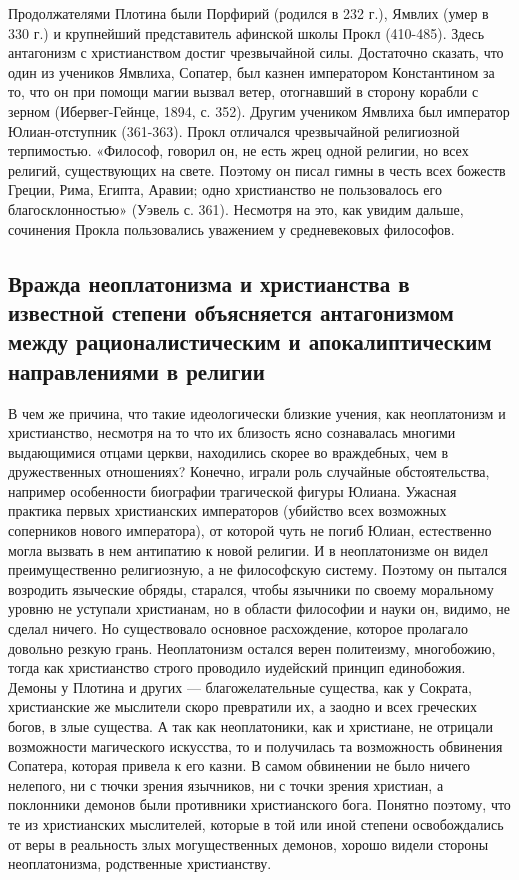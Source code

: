 Продолжателями Плотина были Порфирий (родился в 232 г.), Ямвлих (умер
в 330 г.) и крупнейший представитель афинской школы Прокл (410-485).
Здесь антагонизм с христианством достиг чрезвычайной силы.
Достаточно сказать, что один из учеников Ямвлиха, Сопатер, был казнен
императором Константином за то, что он при помощи магии вызвал ветер,
отогнавший в сторону корабли с зерном (Ибервег-Гейнце, 1894, с. 352).
Другим учеником Ямвлиха был император Юлиан-отступник (361-363). Прокл
отличался чрезвычайной религиозной терпимостью. «Философ, говорил он,
не есть жрец одной религии, но всех религий, существующих на свете.
Поэтому он писал гимны в честь всех божеств Греции, Рима, Египта,
Аравии; одно христианство не пользовалось его благосклонностью»
(Уэвель с. 361). Несмотря на это, как увидим дальше, сочинения Прокла
пользовались уважением у средневековых философов.

\subsection{Вражда неоплатонизма и христианства в известной степени
объясняется антагонизмом между рационалистическим и апокалиптическим
направлениями в религии}

В чем же причина, что такие идеологически близкие учения, как
неоплатонизм и христианство, несмотря на то что их близость ясно
сознавалась многими выдающимися отцами церкви, находились скорее во
враждебных, чем в дружественных отношениях? Конечно, играли роль
случайные обстоятельства, например особенности биографии трагической
фигуры Юлиана. Ужасная практика первых христианских императоров
(убийство всех возможных соперников нового императора), от которой
чуть не погиб Юлиан, естественно могла вызвать в нем антипатию к новой
религии. И в неоплатонизме он видел преимущественно религиозную, а не
философскую систему. Поэтому он пытался возродить языческие обряды,
старался, чтобы язычники по своему моральному уровню не уступали
христианам, но в области философии и науки он, видимо, не сделал
ничего. Но существовало основное расхождение, которое пролагало
довольно резкую грань. Неоплатонизм остался верен политеизму,
многобожию, тогда как христианство строго проводило иудейский принцип
единобожия. Демоны у Плотина и других --- благожелательные существа,
как у Сократа, христианские же мыслители скоро превратили их, а заодно
и всех греческих богов, в злые существа. А так как неоплатоники, как и
христиане, не отрицали возможности магического искусства, то и
получилась та возможность обвинения Сопатера, которая привела к его
казни. В самом обвинении не было ничего нелепого, ни с тючки зрения
язычников, ни с точки зрения христиан, а поклонники демонов были
противники христианского бога. Понятно поэтому, что те из христианских
мыслителей, которые в той или иной степени освобождались от веры в
реальность злых могущественных демонов, хорошо видели стороны
неоплатонизма, родственные христианству.

